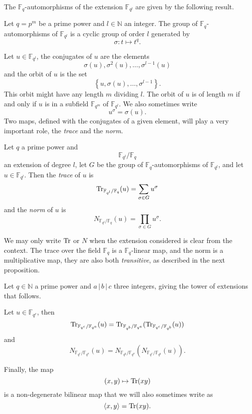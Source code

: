 The $\mathbb{F}_q$-automorphisms of the extension $\mathbb{F}_{q^l}$ are given
by the following result.
\begin{prop}
  Let $q=p^m$ be a prime power and $l\in\mathbb{N}$ an integer.
  The group of $\mathbb{F}_q$-automorphisms of $\mathbb{F}_{q^l}$ is a cyclic
  group of order $l$ generated by
  \[
    \sigma : t\mapsto t^q.
  \]  
\end{prop}
Let $u\in\mathbb{F}_{q^l}$, the conjugates of $u$ are the elements
\[
  \sigma(u), \sigma^2(u), \dots, \sigma^{l-1}(u)
\]
and the orbit of $u$ is the set
\[
  \left\{ u, \sigma(u), \dots, \sigma^{l-1} \right\}.
\]
This orbit might have any length $m$ dividing $l$. The orbit of $u$ is of length
$m$ if and only if $u$ is in a subfield $\mathbb{F}_{q^m}$ of
$\mathbb{F}_{q^l}$. We also sometimes write
\[
  u^\sigma = \sigma(u).
\]
Two maps, defined with the conjugates of a given element,
will play a very important role, the \emph{trace} and the \emph{norm}.
\begin{defi}
  Let $q$ a prime power and 
  \[
    \mathbb{F}_{q^l}/\mathbb{F}_q
  \]
  an extension of degree $l$, let $G$ be the group of
  $\mathbb{F}_q$-automorphisms of $\mathbb{F}_{q^l}$, and let
  $u\in\mathbb{F}_{q^l}$. Then the \emph{trace} of $u$ is
  \[
    \operatorname{Tr}_{\mathbb{F}_{q^l}/\mathbb{F}_q}(u) = \sum_{\sigma\in G}u^\sigma
  \]
  and the \emph{norm} of $u$ is
  \[
    N_{\mathbb{F}_{q^l}/\mathbb{F}_q}(u)=\prod_{\sigma\in G}u^\sigma.
  \]
\end{defi}
We may only write $\operatorname{Tr}$ or $N$ when the extension considered is clear from the
context. The trace over the field $\mathbb{F}_{q}$ is a $\mathbb{F}_{q}$-linear
map, and the norm is a multiplicative map, they are also both \emph{transitive},
as described in the next proposition.
\begin{prop}
  Let $q\in\mathbb{N}$ a prime power and $a\,|\,b\,|\,c$ three integers, giving
  the tower of extensions that follows.
  \begin{center}
  \end{center}
  Let $u\in\mathbb{F}_{q^c}$, then
  \[
    \operatorname{Tr}_{\mathbb{F}_{q^c}/\mathbb{F}_{q^a}}(u) =
    \operatorname{Tr}_{\mathbb{F}_{q^b}/\mathbb{F}_{q^a}}(\operatorname{Tr}_{\mathbb{F}_{q^c}/\mathbb{F}_{q^b}}(u))
  \]
  and
  \[
    N_{\mathbb{F}_{q^c}/\mathbb{F}_{q^a}}(u) =
    N_{\mathbb{F}_{q^b}/\mathbb{F}_{q^a}}(N_{\mathbb{F}_{q^c}/\mathbb{F}_{q^b}}(u)).
  \]
\end{prop}
Finally, the map
\[
  (x, y)\mapsto\operatorname{Tr}(xy)
\]
is a non-degenerate bilinear map that we will also sometimes write as
\[
  \left\langle x,y\right\rangle = \operatorname{Tr}(xy).
\]
%
%

